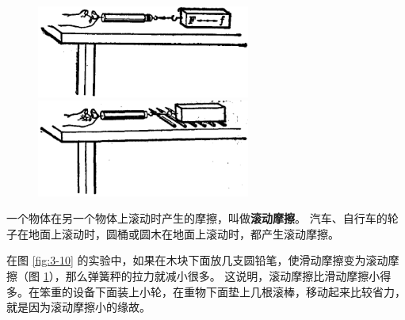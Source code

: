 \begin{figure}[htbp]
    \centering
    \begin{minipage}{7cm}
    \centering
    \includegraphics[width=7cm]{../pic/czwl1-ch3-10}
    \caption{}\label{fig:3-10}
    \end{minipage}
    \qquad
    \begin{minipage}{7cm}
    \centering
    \includegraphics[width=7cm]{../pic/czwl1-ch3-11}
    \caption{}\label{fig:3-11}
    \end{minipage}
\end{figure}


一个物体在另一个物体上滚动时产生的摩擦，叫做\textbf{滚动摩擦}。
汽车、自行车的轮子在地面上滚动时，圆桶或圆木在地面上滚动时，都产生滚动摩擦。

在图 \ref{fig:3-10} 的实验中，如果在木块下面放几支圆铅笔，使滑动摩擦变为滚动摩擦（图 \ref{fig:3-11}），那么弹簧秤的拉力就减小很多。
这说明，滚动摩擦比滑动摩擦小得多。在笨重的设备下面装上小轮，在重物下面垫上几根滚棒，移动起来比较省力，就是因为滚动摩擦小的缘故。


